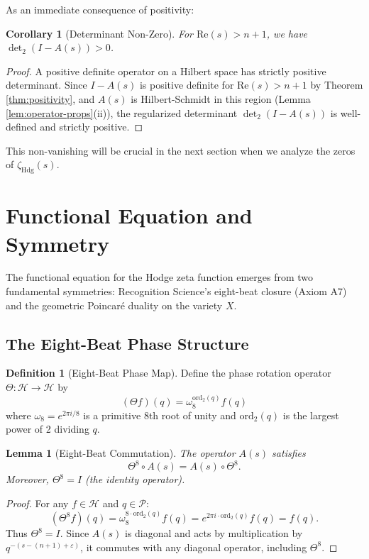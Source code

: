 \documentclass[12pt]{article}
\newtheorem{lemma}[theorem]{Lemma}
\newtheorem{corollary}[theorem]{Corollary}
\theoremstyle{definition}
\newtheorem{definition}[theorem]{Definition}
\theoremstyle{remark}
\begin{document}
As an immediate consequence of positivity:

\begin{corollary}[Determinant Non-Zero]
\label{cor:det-nonzero}
For $\text{Re}(s) > n+1$, we have $\det_2(I - A(s)) > 0$.
\end{corollary}

\begin{proof}
A positive definite operator on a Hilbert space has strictly positive determinant. Since $I - A(s)$ is positive definite for $\text{Re}(s) > n+1$ by Theorem \ref{thm:positivity}, and $A(s)$ is Hilbert-Schmidt in this region (Lemma \ref{lem:operator-props}(ii)), the regularized determinant $\det_2(I - A(s))$ is well-defined and strictly positive.
\end{proof}

This non-vanishing will be crucial in the next section when we analyze the zeros of $\zeta_{\text{Hdg}}(s)$.

\section{Functional Equation and Symmetry}
\label{sec:functional-equation}

The functional equation for the Hodge zeta function emerges from two fundamental symmetries: Recognition Science's eight-beat closure (Axiom A7) and the geometric Poincaré duality on the variety $X$.

\subsection{The Eight-Beat Phase Structure}

\begin{definition}[Eight-Beat Phase Map]
Define the phase rotation operator $\Theta: \mathcal{H} \to \mathcal{H}$ by
\[
(\Theta f)(q) = \omega_8^{\text{ord}_2(q)} f(q)
\]
where $\omega_8 = e^{2\pi i/8}$ is a primitive 8th root of unity and $\text{ord}_2(q)$ is the largest power of 2 dividing $q$.
\end{definition}

\begin{lemma}[Eight-Beat Commutation]
The operator $A(s)$ satisfies
\[
\Theta^8 \circ A(s) = A(s) \circ \Theta^8.
\]
Moreover, $\Theta^8 = I$ (the identity operator).
\end{lemma}

\begin{proof}
For any $f \in \mathcal{H}$ and $q \in \mathcal{P}$:
\[
(\Theta^8 f)(q) = \omega_8^{8 \cdot \text{ord}_2(q)} f(q) = e^{2\pi i \cdot \text{ord}_2(q)} f(q) = f(q).
\]
Thus $\Theta^8 = I$. Since $A(s)$ is diagonal and acts by multiplication by $q^{-(s-(n+1)+\varepsilon)}$, it commutes with any diagonal operator, including $\Theta^8$.
\end{proof}
\end{document}
